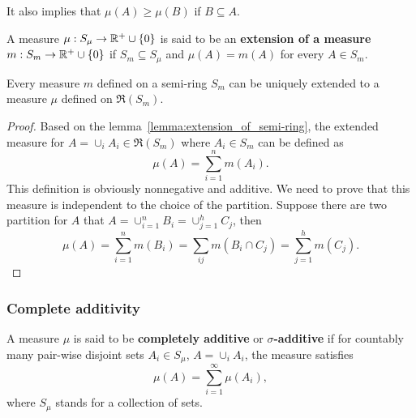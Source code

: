 It also implies that $\mu(A)\ge\mu(B)$ if $B\subseteq A$.

\begin{definition}
A measure $\mu:S_\mu\to\mathbb{R}^+\cup\{0\}$ is said to be an \textbf{extension of a measure} $m:S_m\to\mathbb{R}^+\cup\{0\}$ if $S_m\subseteq S_\mu$ and $\mu(A)=m(A)$ for every $A\in S_m$. 
\end{definition}

\begin{theorem}
Every measure $m$ defined on a semi-ring $S_m$ can be uniquely extended to a measure $\mu$ defined on $\mathfrak{R}(S_m)$.
\end{theorem}

\begin{proof}
Based on the lemma~\ref{lemma:extension_of_semi-ring}, the extended measure for $A=\cup_iA_i\in\mathfrak{R}(S_m)$ where $A_i\in S_m$ can be defined as
\begin{equation}
\mu(A)=\sum_{i=1}^nm(A_i).
\end{equation}
This definition is obviously nonnegative and additive. We need to prove that this measure is independent to the choice of the partition. Suppose there are two partition for $A$ that
$A=\cup_{i=1}^nB_i=\cup_{j=1}^hC_j$, then
\begin{equation}
\mu(A)=\sum_{i=1}^nm(B_i)=\sum_{ij}m(B_i\cap C_j)=\sum_{j=1}^hm(C_j).
\end{equation}
\end{proof}

\subsubsection{Complete additivity}

\begin{definition}
A measure $\mu$ is said to be \textbf{completely additive} or \textbf{$\sigma$-additive} if for countably many pair-wise disjoint sets $A_i\in S_\mu$, $A=\cup_iA_i$, the measure satisfies
\begin{equation}
\mu(A)=\sum_{i=1}^\infty\mu(A_i),
\end{equation}
where $S_\mu$ stands for a collection of sets.
\end{definition}

